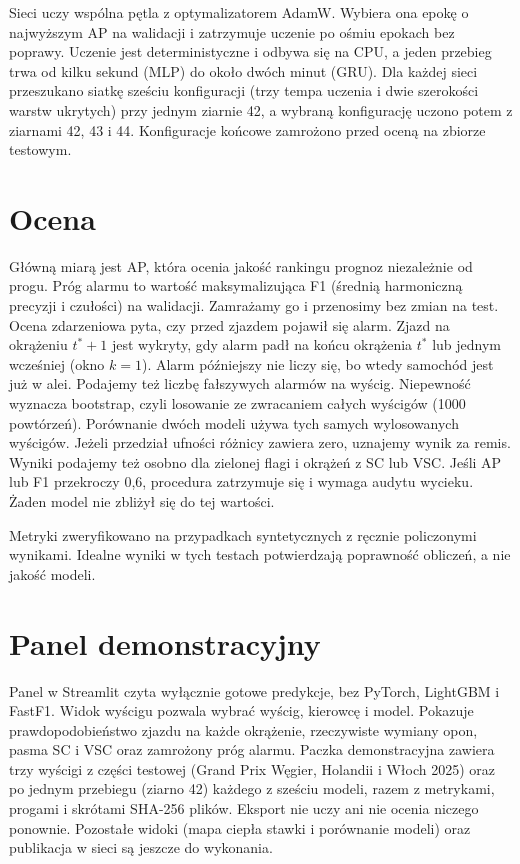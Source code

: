 Sieci uczy wspólna pętla z optymalizatorem AdamW. Wybiera ona epokę
o najwyższym AP na walidacji i zatrzymuje uczenie po ośmiu epokach bez
poprawy. Uczenie jest deterministyczne i odbywa się na CPU, a jeden
przebieg trwa od kilku sekund (MLP) do około dwóch minut (GRU).
Dla każdej sieci przeszukano siatkę sześciu konfiguracji (trzy tempa
uczenia i dwie szerokości warstw ukrytych) przy jednym ziarnie 42, a wybraną
konfigurację uczono potem z ziarnami 42, 43 i 44. Konfiguracje końcowe
zamrożono przed oceną na zbiorze testowym.

\section{Ocena}

Główną miarą jest AP, która ocenia jakość rankingu prognoz niezależnie
od progu. Próg alarmu to wartość maksymalizująca F1 (średnią harmoniczną
precyzji i czułości) na walidacji. Zamrażamy go i przenosimy bez zmian na test.
Ocena zdarzeniowa pyta, czy przed zjazdem pojawił się alarm. Zjazd na okrążeniu $t^*+1$ jest
wykryty, gdy alarm padł na końcu okrążenia $t^*$ lub jednym wcześniej
(okno $k=1$). Alarm późniejszy nie liczy się, bo wtedy samochód jest już
w alei. Podajemy też liczbę fałszywych alarmów na wyścig.
Niepewność wyznacza bootstrap, czyli losowanie ze zwracaniem całych
wyścigów (1000 powtórzeń). Porównanie dwóch modeli używa tych samych
wylosowanych wyścigów. Jeżeli przedział ufności różnicy zawiera zero,
uznajemy wynik za remis. Wyniki podajemy też osobno dla zielonej flagi
i okrążeń z SC lub VSC. Jeśli AP lub F1 przekroczy 0,6, procedura
zatrzymuje się i wymaga audytu wycieku. Żaden model nie zbliżył się
do tej wartości.

Metryki zweryfikowano na przypadkach syntetycznych z ręcznie policzonymi
wynikami. Idealne wyniki w tych testach potwierdzają poprawność
obliczeń, a nie jakość modeli.

\section{Panel demonstracyjny}

Panel w Streamlit czyta wyłącznie gotowe predykcje, bez PyTorch, LightGBM
i FastF1. Widok wyścigu pozwala wybrać wyścig, kierowcę i model.
Pokazuje prawdopodobieństwo zjazdu na każde okrążenie, rzeczywiste wymiany
opon, pasma SC i VSC oraz zamrożony próg alarmu. Paczka demonstracyjna
zawiera trzy wyścigi z części testowej (Grand Prix Węgier, Holandii
i Włoch 2025) oraz po jednym przebiegu (ziarno 42) każdego z sześciu modeli,
razem z metrykami, progami i skrótami SHA-256 plików. Eksport nie uczy ani
nie ocenia niczego ponownie. Pozostałe widoki (mapa ciepła stawki i
porównanie modeli) oraz publikacja w sieci są jeszcze do wykonania.

